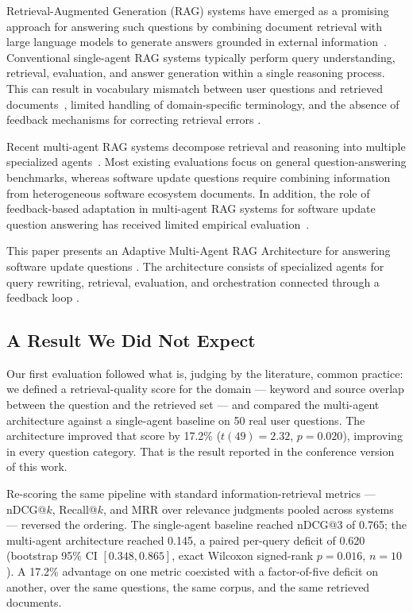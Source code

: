 \documentclass[acmsmall,review,anonymous,screen]{acmart}
\begin{document}
Retrieval-Augmented Generation (RAG) systems have emerged as a promising approach for answering such questions by combining document retrieval with large language models to generate answers grounded in external information~\cite{lewis2020rag}. Conventional single-agent RAG systems typically perform query understanding, retrieval, evaluation, and answer generation within a single reasoning process. This can result in vocabulary mismatch between user questions and retrieved documents~\cite{gao2024dmqr}, limited handling of domain-specific terminology, and the absence of feedback mechanisms for correcting retrieval errors \cite{cook2025rag}.

Recent multi-agent RAG systems decompose retrieval and reasoning into multiple specialized agents~\cite{wang2024mainrag, nguyen2025marag}. Most existing evaluations focus on general question-answering benchmarks, whereas software update questions require combining information from heterogeneous software ecosystem documents. In addition, the role of feedback-based adaptation in multi-agent RAG systems for software update question answering has received limited empirical evaluation~\cite{ma2023rafe}.

This paper presents an Adaptive Multi-Agent RAG Architecture for answering software update questions \cite{he2025,joshi2025review}. The architecture consists of specialized agents for query rewriting, retrieval, evaluation, and orchestration connected through a feedback loop \cite{adimulam2026,roman2026}.

\subsection{A Result We Did Not Expect}

Our first evaluation followed what is, judging by the literature, common
practice: we defined a retrieval-quality score for the domain --- keyword and
source overlap between the question and the retrieved set --- and compared the
multi-agent architecture against a single-agent baseline on 50 real user
questions. The architecture improved that score by 17.2\% ($t(49)=2.32$,
$p=0.020$), improving in every question category. That is the result reported in
the conference version of this work.

Re-scoring the same pipeline with standard information-retrieval metrics ---
nDCG@$k$, Recall@$k$, and MRR over relevance judgments pooled across systems ---
reversed the ordering. The single-agent baseline reached nDCG@3 of 0.765; the
multi-agent architecture reached 0.145, a paired per-query deficit of 0.620
(bootstrap 95\% CI $[0.348, 0.865]$, exact Wilcoxon signed-rank $p=0.016$,
$n=10$). A 17.2\% advantage on one metric
coexisted with a factor-of-five deficit on another, over the same questions, the
same corpus, and the same retrieved documents.
\end{document}
